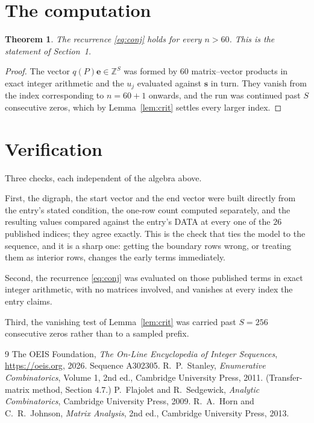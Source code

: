\documentclass[11pt,a4paper]{article}
\theoremstyle{plain}
\newtheorem{theorem}{Theorem}
\theoremstyle{definition}
\begin{document}
\section{The computation}

\begin{theorem}
The recurrence \eqref{eq:conj} holds for every $n>60$. This is the statement of
Section~1.
\end{theorem}

\begin{proof}
The vector $q(P)\mathbf{e}\in\mathbb{Z}^{S}$ was formed by $60$ matrix--vector
products in exact integer arithmetic and the $u_j$ evaluated against $\mathbf{s}$ in turn.
They vanish from the index corresponding to $n=60+1$ onwards, and the run was continued
past $S$ consecutive zeros, which by Lemma~\ref{lem:crit} settles every larger index.
\end{proof}

\section{Verification}

Three checks, each independent of the algebra above.

First, the digraph, the start vector and the end vector were built directly from the
entry's stated condition, the one-row count computed separately, and the resulting values
compared against the entry's DATA at every one of the $26$ published indices; they
agree exactly. This is the check that ties the model to the sequence, and it is a sharp one:
getting the boundary rows wrong, or treating them as interior rows, changes the early terms
immediately.

Second, the recurrence \eqref{eq:conj} was evaluated on those published terms in exact
integer arithmetic, with no matrices involved, and vanishes at every index the entry claims.

Third, the vanishing test of Lemma~\ref{lem:crit} was carried past $S=256$ consecutive
zeros rather than to a sampled prefix.

\begin{thebibliography}{9}
 The OEIS Foundation, \emph{The On-Line Encyclopedia of Integer
Sequences}, \url{https://oeis.org}, 2026. Sequence A302305.
 R.~P.~Stanley, \emph{Enumerative Combinatorics}, Volume 1, 2nd ed.,
Cambridge University Press, 2011. (Transfer-matrix method, Section 4.7.)
 P.~Flajolet and R.~Sedgewick, \emph{Analytic Combinatorics}, Cambridge
University Press, 2009.
 R.~A.~Horn and C.~R.~Johnson, \emph{Matrix Analysis}, 2nd ed., Cambridge
University Press, 2013.
\end{thebibliography}
\end{document}
